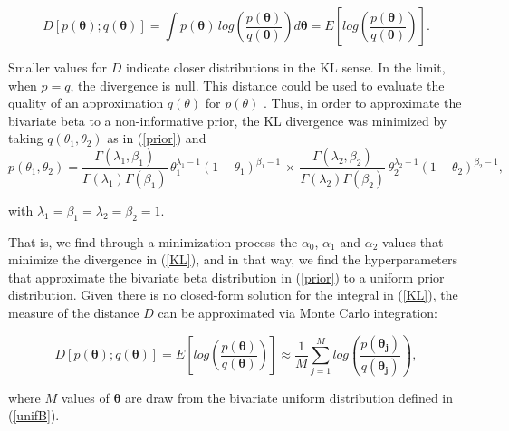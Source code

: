 \documentclass[AMA,Times1COL]{WileyNJDv5} %
\begin{document}
\begin{equation}\label{KL}
 D\left[p(\boldsymbol{\theta});q(\boldsymbol{\theta})\right]=\int p(\boldsymbol{\theta})\,log\left(\frac{p(\boldsymbol{\theta})}{q(\boldsymbol{\theta})}\right)d\boldsymbol{\theta}= E\left[ log\left(\frac{p(\boldsymbol{\theta})}{q(\boldsymbol{\theta})}\right)\right]. 
\end{equation}

Smaller values for $D$ indicate closer distributions in the KL sense. In the limit, when $p = q$, the divergence is null. This distance could be used to evaluate the quality of an approximation $q(\theta)$ for $p(\theta)$ \cite{Gamerman2014}. Thus, in order to approximate the bivariate beta to a non-informative prior, the KL divergence was minimized by taking $q(\theta_1,\theta_2)$ as in (\ref{prior}) and 
\begin{equation}\label{unifB}
p(\theta_1,\theta_2)=\dfrac{\Gamma(\lambda_1,\beta_1)}{\Gamma(\lambda_1)\Gamma(\beta_1)} \, \theta_1^{\lambda_1-1} (1-\theta_1)^{\beta_1-1} \, \times \, \dfrac{\Gamma(\lambda_2,\beta_2)}{\Gamma(\lambda_2)\Gamma(\beta_2)} \, \theta_2^{\lambda_2-1} (1-\theta_2)^{\beta_2-1}, 
\end{equation}
\vspace{1em}

with $\lambda_1=\beta_1=\lambda_2=\beta_2=1$.
\vspace{1em} 

That is, we find through a minimization process the $\alpha_0$, $\alpha_1$ and $\alpha_2$ values that minimize the divergence in (\ref{KL}), and in that way, we find the hyperparameters that approximate the bivariate beta distribution in (\ref{prior}) to a uniform prior distribution. Given there is no closed-form solution for the integral in (\ref{KL}), the measure of the distance $D$ can be approximated via Monte Carlo integration:

\begin{equation*}\label{KL3}
 D\left[p(\boldsymbol{\theta});q(\boldsymbol{\theta})\right]= 
 E\left[ log\left(\frac{p(\boldsymbol{\theta})}{q(\boldsymbol{\theta})}\right)\right] \approx \frac{1}{M}\sum\limits_{j=1}^{M}  log\left(\frac{p(\boldsymbol{\theta_j})}{q(\boldsymbol{\theta_j})}\right), 
\end{equation*}

where $M$ values of $\boldsymbol{\theta}$ are draw from the bivariate uniform distribution defined in (\ref{unifB}).
\end{document}
